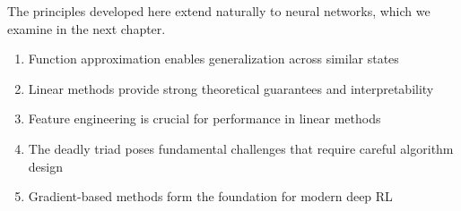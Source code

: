The principles developed here extend naturally to neural networks, which we examine in the next chapter.

\begin{keyideabox}
\begin{enumerate}
\item Function approximation enables generalization across similar states
\item Linear methods provide strong theoretical guarantees and interpretability
\item Feature engineering is crucial for performance in linear methods
\item The deadly triad poses fundamental challenges that require careful algorithm design
\item Gradient-based methods form the foundation for modern deep RL
\end{enumerate}
\end{keyideabox}